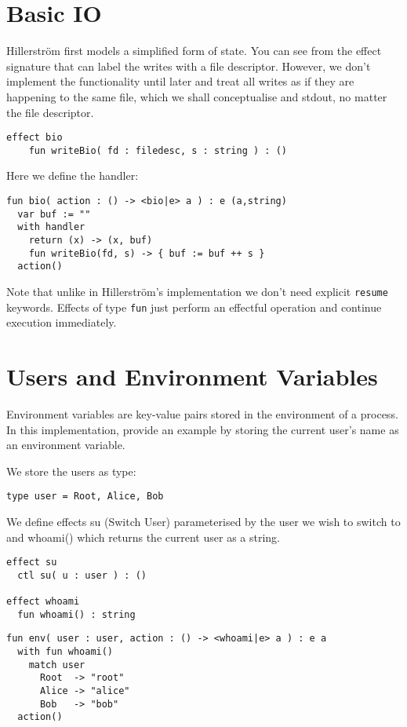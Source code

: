 \documentclass[logo,bsc,singlespacing,parskip]{infthesis}
\begin{document}
\section{Basic IO}
Hillerström first models a simplified form of state. You can see from the effect signature that can label the writes with a file descriptor. However, we don't implement the functionality until later and treat all writes as if they are happening to the same file, which we shall conceptualise and stdout, no matter the file descriptor.

\begin{lstlisting}
effect bio
    fun writeBio( fd : filedesc, s : string ) : ()
\end{lstlisting}

Here we define the handler:

\begin{lstlisting}
fun bio( action : () -> <bio|e> a ) : e (a,string)
  var buf := ""    
  with handler
    return (x) -> (x, buf)
    fun writeBio(fd, s) -> { buf := buf ++ s }
  action()
\end{lstlisting}

Note that unlike in Hillerström's implementation we don't need explicit \texttt{resume} keywords. Effects of type \texttt{fun} just perform an effectful operation and continue execution immediately. 

\section{Users and Environment Variables}
Environment variables are key-value pairs stored in the environment of a process. In this implementation, provide an example by storing the current user's name as an environment variable.

We store the users as type:
\begin{lstlisting}
type user = Root, Alice, Bob
\end{lstlisting}

We define effects su (Switch User) parameterised by the user we wish to switch to and whoami() which returns the current user as a string.
\begin{lstlisting}
effect su
  ctl su( u : user ) : ()

effect whoami
  fun whoami() : string
\end{lstlisting}


\begin{lstlisting}
fun env( user : user, action : () -> <whoami|e> a ) : e a
  with fun whoami() 
    match user
      Root  -> "root"
      Alice -> "alice"
      Bob   -> "bob"
  action()
\end{lstlisting}
\end{document}
